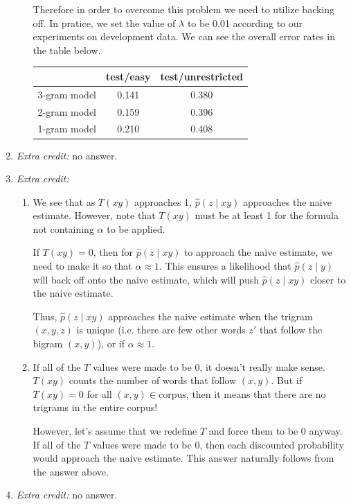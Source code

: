 \documentclass[11pt]{article}
\begin{document}
\begin{enumerate}
\begin{enumerate}[label=(\alph*)]
		Therefore in order to overcome this problem we need to utilize backing off. In pratice, we set the value of $\lambda$ to be 0.01 according to our experiments on development data. We can see the overall error rates in the table below. \\

		\begin{center}\begin{tabular}{| r || c | c |}
			\hline
			\ 				&	test/easy	&	test/unrestricted 	\\
			\hline \hline
			3-gram model 	&	0.141		&	0.380				\\
			2-gram model 	&	0.159		&	0.396				\\
			1-gram model 	&	0.210		&	0.408				\\
			\hline	
		\end{tabular}\end{center}

	\end{enumerate}
\item %
	\textit{Extra credit:} no answer.
\item %
	\textit{Extra credit:}
	\begin{enumerate}[label=(\alph*)]
	\item
		We see that as $T(xy)$ approaches 1, $\hat{p}(z \mid xy)$ approaches the naive estimate. However, note that $T(xy)$ must be at least 1 for the formula not containing $\alpha$ to be applied.

		If $T(xy) = 0$, then for $\hat{p}(z \mid xy)$ to approach the naive estimate, we need to make it so that $\alpha \approx 1$. This ensures a likelihood that $\hat{p}(z \mid y)$ will back off onto the naive estimate, which will push $\hat{p}(z \mid xy)$ closer to the naive estimate.

		Thus, $\hat{p}(z \mid xy)$ approaches the naive estimate when the trigram $(x,y,z)$ is unique (i.e. there are few other words $z'$ that follow the bigram $(x,y)$), or if $\alpha \approx 1$.
	\item
		If all of the $T$ values were made to be 0, it doesn't really make sense. $T(xy)$ counts the number of words that follow $(x,y)$. But if $T(xy) =0$ for all $(x,y) \in \text{corpus}$, then it means that there are no trigrams in the entire corpus!

		However, let's assume that we redefine $T$ and force them to be 0 anyway. If all of the $T$ values were made to be 0, then each discounted probability would approach the naive estimate. This answer naturally follows from the answer above.


	\end{enumerate}
\item %
	\textit{Extra credit:} no answer.

\end{enumerate}
\end{document}

